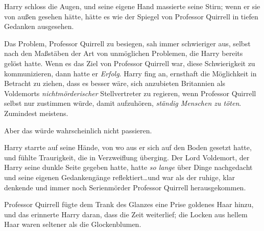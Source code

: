 Harry schloss die Augen, und seine eigene Hand massierte seine Stirn; wenn er sie von außen gesehen hätte, hätte es wie der Spiegel von Professor Quirrell in tiefen Gedanken ausgesehen.

Das Problem, Professor Quirrell zu besiegen, sah immer schwieriger aus, selbst nach den Maßstäben der Art von unmöglichen Problemen, die Harry bereits gelöst hatte. Wenn es das Ziel von Professor Quirrell war, diese Schwierigkeit zu kommunizieren, dann hatte er \emph{Erfolg}.
Harry fing an, ernsthaft die Möglichkeit in Betracht zu ziehen, dass es besser wäre, sich anzubieten Britannien als Voldemorts \emph{nichtmörderischer} Stellvertreter zu regieren, wenn Professor Quirrell selbst nur zustimmen würde, damit aufzuhören, \emph{ständig Menschen zu töten}. Zumindest meistens.

Aber das würde wahrscheinlich nicht passieren.

Harry starrte auf seine Hände, von wo aus er sich auf den Boden gesetzt hatte, und fühlte Traurigkeit, die in Verzweiflung überging.
Der Lord Voldemort, der Harry seine dunkle Seite gegeben hatte, hatte \emph{so lange} über Dinge nachgedacht und seine eigenen Gedankengänge reflektiert…und war als der ruhige, klar denkende und immer noch Serienmörder Professor Quirrell herausgekommen.

Professor Quirrell fügte dem Trank des Glanzes eine Prise goldenes Haar hinzu, und das erinnerte Harry daran, dass die Zeit weiterlief; die Locken aus hellem Haar waren seltener als die Glockenblumen.

